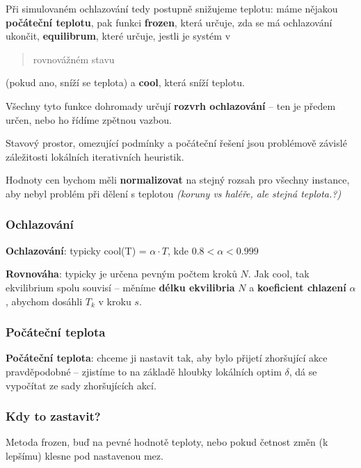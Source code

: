 \vspace{4pt}
\noindent Při simulovaném ochlazování tedy postupně snižujeme teplotu: máme nějakou \textbf{počáteční teplotu}, pak funkci \textbf{frozen}, která určuje, zda se má ochlazování ukončit, \textbf{equilibrum}, které určuje, jestli je systém v \blockquote{rovnovážném stavu} (pokud ano, sníží se teplota) a \textbf{cool}, která sníží teplotu.

\vspace{4pt}
\noindent Všechny tyto funkce dohromady určují \textbf{rozvrh ochlazování} -- ten je předem určen, nebo ho řídíme zpětnou vazbou.

\vspace{4pt}
\noindent Stavový prostor, omezující podmínky a počáteční řešení jsou problémově závislé záležitosti lokálních iterativních heuristik.

\vspace{4pt}
\noindent Hodnoty cen bychom měli \textbf{normalizovat} na stejný rozsah pro všechny instance, aby nebyl problém při dělení s teplotou \textit{(koruny vs haléře, ale stejná teplota.?)}

\subsubsection*{Ochlazování}

\textbf{Ochlazování}: typicky cool(T) = $\alpha \cdot T$, kde $0.8 < \alpha < 0.999$

\vspace{4pt}
\noindent \textbf{Rovnováha}: typicky je určena pevným počtem kroků $N$. Jak cool, tak ekvilibrium spolu souvisí -- měníme \textbf{délku ekvilibria} $N$ a \textbf{koeficient chlazení} $\alpha$, abychom dosáhli $T_k$ v kroku $s$.

\subsubsection*{Počáteční teplota}

\textbf{Počáteční teplota}: chceme ji nastavit tak, aby bylo přijetí zhoršující akce pravděpodobné -- zjistíme to na základě hloubky lokálních optim $\delta$, dá se vypočítat ze sady zhoršujících akcí.

\subsubsection*{Kdy to zastavit?}

Metoda frozen, buď na pevné hodnotě teploty, nebo pokud četnost změn (k lepšímu) klesne pod nastavenou mez.


